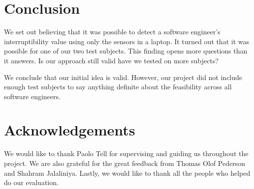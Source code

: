 \documentclass{sigchi}
\begin{document}
\section{Conclusion}
We set out believing that it was possible to detect a software engineer’s interruptibility value using only the sensors in a laptop.
It turned out that it was possible for one of our two test subjects.
This finding opens more questions than it answers. Is our approach still valid have we tested on more subjects?

We conclude that our initial idea is valid.
However, our project did not include enough test subjects to say anything definite about the feasibility across all software engineers.

\section{Acknowledgements}
We would like to thank Paolo Tell for supervising and guiding us throughout the project.
We are also grateful for the great feedback from Thomas Olof Pederson and Shahram Jalaliniya.
Lastly, we would like to thank all the people who helped do our evaluation.

\balance


\end{document}
